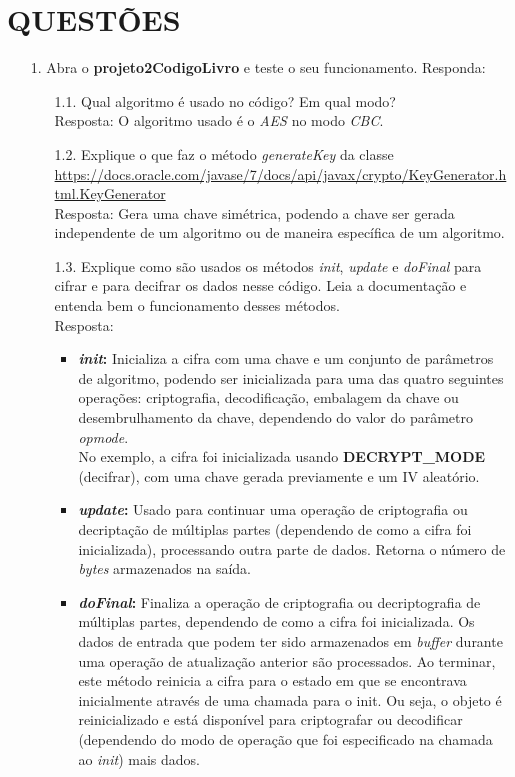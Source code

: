 \documentclass[12pt,a4paper]{article}
\newcommand{\link}[1]{{\color{blue}\url{#1}}}
\begin{document}
	\section{\normalsize QUESTÕES}
		\begin{enumerate}
			\item[1.] Abra o \textbf{projeto2CodigoLivro} e teste o seu funcionamento. Responda:
			
			\begin{enumerate}
				\item[1.1.] Qual algoritmo é usado no código? Em qual modo?\\
				Resposta: O algoritmo usado é o \textit{AES} no modo \textit{CBC}.
				
				\item[1.2.] Explique o que faz o método \textit{generateKey} da classe \link{https://docs.oracle.com/javase/7/docs/api/javax/crypto/KeyGenerator.html.KeyGenerator}\\
				Resposta: Gera uma chave simétrica, podendo a chave ser gerada independente de um algoritmo ou de maneira específica de um algoritmo.
				
				\item[1.3.] Explique como são usados os métodos \textit{init}, \textit{update} e \textit{doFinal} para cifrar e para decifrar os dados nesse código. Leia a documentação e entenda bem o funcionamento desses métodos.\\
				Resposta:\\
				\begin{itemize}
					\item \textbf{\textit{init}:} Inicializa a cifra com uma chave e um conjunto de parâmetros de algoritmo, podendo ser inicializada para uma das quatro seguintes operações: criptografia, decodificação, embalagem da chave ou desembrulhamento da chave, dependendo do valor do parâmetro \textit{opmode}.\\
					No exemplo, a cifra foi inicializada usando \textbf{DECRYPT\_MODE} (decifrar), com uma chave gerada previamente e um IV aleatório. 
					
					\item \textbf{\textit{update}:} Usado para continuar uma operação de criptografia ou decriptação de múltiplas partes (dependendo de como a cifra foi inicializada), processando outra parte de dados. Retorna o número de \textit{bytes} armazenados na saída.
					
					\item \textbf{\textit{doFinal}:} Finaliza a operação de criptografia ou decriptografia de múltiplas partes,  dependendo de como a cifra foi inicializada. Os dados de entrada que podem ter sido armazenados em \textit{buffer} durante uma operação de atualização anterior são processados. Ao terminar, este método reinicia a cifra para o estado em que se encontrava inicialmente através de uma chamada para o init. Ou seja, o objeto é reinicializado e está disponível para criptografar ou decodificar (dependendo do modo de operação que foi especificado na chamada ao \textit{init}) mais dados.
				\end{itemize}
			\end{enumerate}
			

\end{enumerate}
\end{document}
